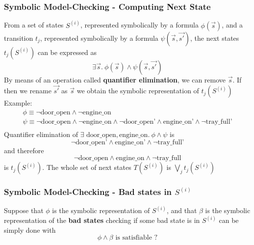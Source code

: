 \begin{frame}
  \frametitle{Symbolic Model-Checking - Computing Next State}

  \scriptsize

  From a set of states $S^{(i)}$, represented symbolically by a formula $\phi( \vec{s} )$,
  and a transition $t_j$, represented symbolically by a formula $\psi( \vec{s}, \vec{s'} )$,
  the next states $t_j(S^{(i)})$ can be expressed as
  $$
  \exists \vec{s}.\ \phi( \vec{s} ) \wedge \psi( \vec{s}, \vec{s'} )
  $$
  By means of an operation called {\bf quantifier elimination}, we can remove $\vec{s}$.
  If then we rename $\vec{s'}$ as $\vec{s}$ we obtain the symbolic representation of $t_j(S^{(i)})$
  \vfill\pause
  Example:
  $$
  \begin{array}{l}
    \phi \equiv \neg \mbox{door\_open} \wedge \neg \mbox{engine\_on} \\
    \psi \equiv \neg \mbox{door\_open} \wedge \neg \mbox{engine\_on} \wedge 
                \neg \mbox{door\_open'} \wedge \mbox{engine\_on'} \wedge \neg \mbox{tray\_full'} \\
  \end{array}
  $$
  Quantifier elimination of $\exists \mbox{ door\_open}, \mbox{engine\_on}.\ \phi \wedge \psi$ is
  $$
    \neg \mbox{door\_open'} \wedge \mbox{engine\_on'} \wedge \neg \mbox{tray\_full'} 
  $$
  and therefore
  $$
    \neg \mbox{door\_open} \wedge \mbox{engine\_on} \wedge \neg \mbox{tray\_full} 
  $$
  is $t_j(S^{(i)})$. The whole set of next states $T(S^{(i)})$ is 
  $\bigvee_j t_j( S^{(i)} )$

\end{frame}

\begin{frame}
  \frametitle{Symbolic Model-Checking - Bad states in $S^{(i)}$}

  Suppose that $\phi$ is the symbolic representation of $S^{(i)}$,
  and that $\beta$ is the symbolic representation of the {\bf bad states}
  \vfill
  checking if some bad state is in $S^{(i)}$ can be simply done with\pause
  $$
    \phi \wedge \beta \mbox{ is satisfiable ?}
  $$

\end{frame}

